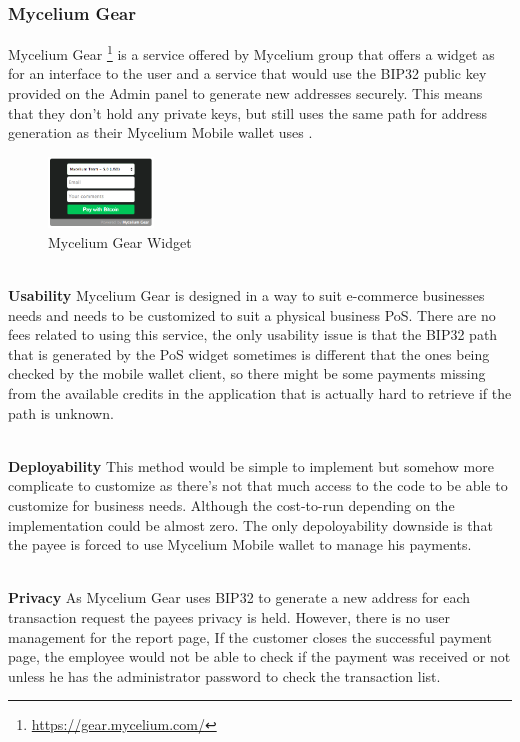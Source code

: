 \subsubsection{Mycelium Gear}
Mycelium Gear \footnote{\url{https://gear.mycelium.com/}} is a service offered by Mycelium group that offers a widget as for an interface to the user and a service that would use the BIP32 public key provided on the Admin panel to generate new addresses securely. This means that they don't hold any private keys, but still uses the same path for address generation as their Mycelium Mobile wallet uses .

\begin{figure}[h]
\centering
\includegraphics[width=0.25\textwidth]{fig/Mycelium_gear}
  \caption{Mycelium Gear Widget}
\label{fig:mycelium-widget}
\end{figure}


\\ \textbf{Usability}
Mycelium Gear is designed in a way to suit e-commerce businesses needs and needs to be customized to suit a physical business PoS. There are no fees related to using this service, the only usability issue is that the BIP32 path that is generated by the PoS widget sometimes is different that the ones being checked by the mobile wallet client, so there might be some payments missing from the available credits in the application that is actually hard to retrieve if the path is unknown.

\\ \textbf{Deployability}
This method would be simple to implement but somehow more complicate to customize as there's not that much access to the code to be able to customize for business needs. Although the cost-to-run depending on the implementation could be almost zero. The only depoloyability downside is that the payee is forced to use Mycelium Mobile wallet to manage his payments.

\\ \textbf{Privacy}
As Mycelium Gear uses BIP32 to generate a new address for each transaction request the payees privacy is held. However, there is no user management for the report page, If the customer closes the successful payment page, the employee would not be able to check if the payment was received or not unless he has the administrator password to check the transaction list.

